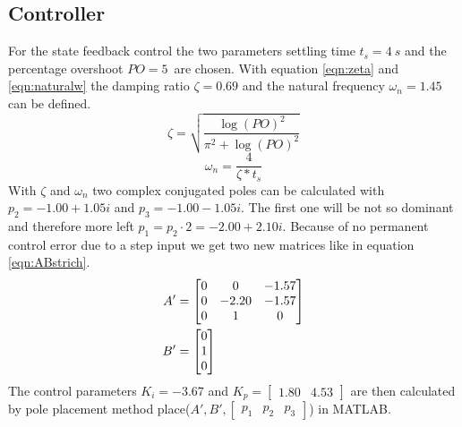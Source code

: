 \subsection{Controller} \label{sec:controller}
For the state feedback control the two parameters settling time $t_s = \SI{4}{s}$ and the percentage overshoot $PO = 5\,$ are chosen. With equation \ref{eqn:zeta} and \ref{eqn:naturalw} the damping ratio $\zeta = 0.69$ and the natural frequency $\omega_n = 1.45$ can be defined.
\begin{equation}
    \zeta = \sqrt{\frac{\log(PO)^2}{\pi^2 + \log(PO)^2}}
    \label{eqn:zeta}
\end{equation}
\begin{equation}
    \omega_n = \frac{4}{\zeta * t_s}
    \label{eqn:naturalw}
\end{equation}
With $\zeta$ and $\omega_n$ two complex conjugated poles can be calculated with $p_2 = -1.00 + 1.05i$ and $p_3 = -1.00 - 1.05i$. The first one will be not so dominant and therefore more left $p_1 = p_2 \cdot 2 = -2.00 + 2.10i$. Because of no permanent control error due to a step input we get two new matrices like in equation \ref{eqn:ABstrich}. \cite{Skript}
\begin{equation}
\begin{split}
    A' &= \begin{bmatrix} 0 & 0 & -1.57 \cr 0 & -2.20 & -1.57 \cr 0 & 1 & 0 \end{bmatrix} \\
    B' &= \begin{bmatrix} 0 \cr 1 \cr 0 \end{bmatrix} 
    \label{eqn:ABstrich}
\end{split}
\end{equation}
The control parameters $K_i = -3.67$ and $K_p = \begin{bmatrix} 1.80 & 4.53 \end{bmatrix}$ are then calculated by pole placement method place($A', B', \begin{bmatrix} p_1 & p_2 & p_3 \end{bmatrix}$) in MATLAB. 

